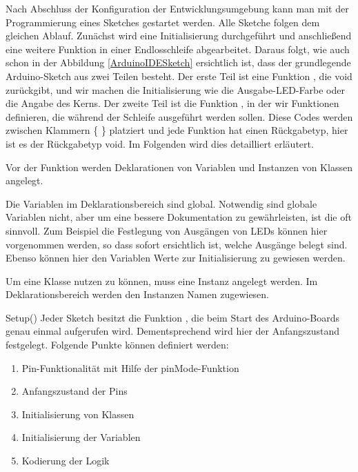 Nach Abschluss der Konfiguration der Entwicklungsumgebung kann man mit der Programmierung eines Sketches gestartet werden. Alle Sketche folgen dem gleichen Ablauf. Zunächst wird eine Initialisierung durchgeführt und anschließend eine weitere Funktion in einer Endlosschleife abgearbeitet.
Daraus folgt, wie auch schon in der Abbildung \ref{ArduinoIDESketch}  ersichtlich ist, dass der grundlegende Arduino-Sketch aus zwei Teilen besteht. Der erste Teil ist eine Funktion , die void zurückgibt, und wir machen die Initialisierung wie die Ausgabe-LED-Farbe oder die Angabe des Kerns. Der zweite Teil ist die Funktion , in der wir Funktionen definieren, die während der Schleife ausgeführt werden sollen. Diese Codes werden zwischen Klammern \{ \} platziert und jede Funktion hat einen Rückgabetyp, hier ist es der Rückgabetyp void. Im Folgenden wird dies detailliert erläutert.

\bigskip

Vor der Funktion  werden Deklarationen von Variablen und Instanzen von Klassen angelegt. 

Die Variablen im Deklarationsbereich sind global. Notwendig sind globale Variablen nicht, aber um eine bessere Dokumentation zu gewährleisten, ist die oft sinnvoll. Zum Beispiel die Festlegung von Ausgängen von LEDs können hier vorgenommen werden, so dass sofort ersichtlich ist, welche Ausgänge belegt sind. Ebenso können hier den Variablen Werte zur Initialisierung zu gewiesen werden.

Um eine Klasse nutzen zu können, muss eine Instanz angelegt werden. Im Deklarationsbereich werden den Instanzen Namen zugewiesen.




Setup()
Jeder Sketch besitzt die Funktion , die beim Start des Arduino-Boards genau einmal aufgerufen wird. Dementsprechend wird hier der Anfangszustand festgelegt. Folgende Punkte können definiert werden:

\begin{enumerate}
  \item Pin-Funktionalität mit Hilfe der pinMode-Funktion 
  \item Anfangszustand der Pins
  \item Initialisierung von Klassen
  \item Initialisierung der Variablen
  \item Kodierung der Logik 
\end{enumerate}

